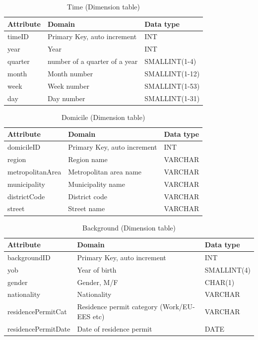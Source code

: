 \begin{table}[htbp]
  \centering
  \caption{Time (Dimension table)}
  \begin{tabular}{|l|l|l|}
    \hline
    \textbf{Attribute} & \textbf{Domain} & \textbf{Data type} \\
    \hline
    timeID & Primary Key, auto increment & INT \\
    \hline
    year & Year & INT \\
    \hline
    quarter & number of a quarter of a year & SMALLINT(1-4) \\
    \hline
    month & Month number & SMALLINT(1-12) \\
    \hline
    week & Week number & SMALLINT(1-53) \\
    \hline
    day & Day number & SMALLINT(1-31) \\
    \hline
  \end{tabular}
\end{table}

\begin{table}[htbp]
  \centering
  \caption{Domicile (Dimension table)}
  \begin{tabular}{|l|l|l|}
    \hline
    \textbf{Attribute} & \textbf{Domain} & \textbf{Data type} \\
    \hline
    domicileID & Primary Key, auto increment & INT \\
    \hline
    region & Region name & VARCHAR \\
    \hline
    metropolitanArea & Metropolitan area name & VARCHAR \\
    \hline
    municipality & Municipality name & VARCHAR \\
    \hline
    districtCode & District code & VARCHAR \\
    \hline
    street & Street name & VARCHAR \\
    \hline
  \end{tabular}
\end{table}

\begin{table}[htbp]
  \centering
  \caption{Background (Dimension table)}
  \begin{tabular}{|l|l|l|}
    \hline
    \textbf{Attribute} & \textbf{Domain} & \textbf{Data type} \\
    \hline
    backgroundID & Primary Key, auto increment & INT \\
    \hline
    yob & Year of birth & SMALLINT(4) \\
    \hline
    gender & Gender, M/F & CHAR(1) \\
    \hline
    nationality & Nationality & VARCHAR \\
    \hline
    residencePermitCat & Residence permit category (Work/EU-EES etc) & VARCHAR \\
    \hline
    residencePermitDate & Date of residence permit & DATE \\
    \hline
  \end{tabular}
\end{table}


